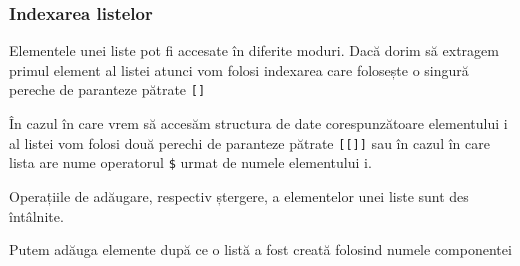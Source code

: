 \documentclass[]{article}
\newenvironment{Shaded}{\begin{snugshade}}{\end{snugshade}}
\newcommand{\CommentTok}[1]{\textcolor[rgb]{0.56,0.35,0.01}{\textit{#1}}}
\newcommand{\DecValTok}[1]{\textcolor[rgb]{0.00,0.00,0.81}{#1}}
\newcommand{\KeywordTok}[1]{\textcolor[rgb]{0.13,0.29,0.53}{\textbf{#1}}}
\newcommand{\NormalTok}[1]{#1}
\newcommand{\OperatorTok}[1]{\textcolor[rgb]{0.81,0.36,0.00}{\textbf{#1}}}
\newcommand{\StringTok}[1]{\textcolor[rgb]{0.31,0.60,0.02}{#1}}
\begin{document}
\hypertarget{indexarea-listelor}{%
\subsubsection{Indexarea listelor}\label{indexarea-listelor}}

Elementele unei liste pot fi accesate în diferite moduri. Dacă dorim să
extragem primul element al listei atunci vom folosi indexarea care
folosește o singură pereche de paranteze pătrate \texttt{{[}{]}}

\begin{Shaded}
\end{Shaded}

În cazul în care vrem să accesăm structura de date corespunzătoare
elementului i al listei vom folosi două perechi de paranteze pătrate
\texttt{{[}{[}{]}{]}} sau în cazul în care lista are nume operatorul
\texttt{\$} urmat de numele elementului i.

\begin{Shaded}
\end{Shaded}

Operațiile de adăugare, respectiv ștergere, a elementelor unei liste
sunt des întâlnite.

Putem adăuga elemente după ce o listă a fost creată folosind numele
componentei
\end{document}
